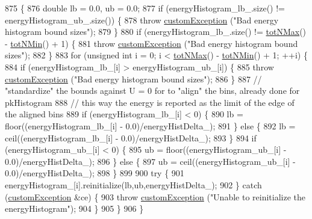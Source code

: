 \begin{DoxyCode}
875                                              \{
876     \textcolor{keywordtype}{double} lb = 0.0, ub = 0.0;
877     \textcolor{keywordflow}{if} (energyHistogram\_lb\_.size() != energyHistogram\_ub\_.size()) \{
878         \textcolor{keywordflow}{throw} \hyperlink{classcustom_exception}{customException} (\textcolor{stringliteral}{"Bad energy histogram bound sizes"});
879     \}
880     \textcolor{keywordflow}{if} (energyHistogram\_lb\_.size() != \hyperlink{classsim_system_aee2c65ecb43a35c0c4d070cdb45f7dc0}{totNMax}() - \hyperlink{classsim_system_af10842e0eaa638373b8717c87b47e6bc}{totNMin}() + 1) \{
881         \textcolor{keywordflow}{throw} \hyperlink{classcustom_exception}{customException} (\textcolor{stringliteral}{"Bad energy histogram bound sizes"});
882     \}
883     \textcolor{keywordflow}{for} (\textcolor{keywordtype}{unsigned} \textcolor{keywordtype}{int} i = 0; i < \hyperlink{classsim_system_aee2c65ecb43a35c0c4d070cdb45f7dc0}{totNMax}() - \hyperlink{classsim_system_af10842e0eaa638373b8717c87b47e6bc}{totNMin}() + 1; ++i) \{
884         \textcolor{keywordflow}{if} (energyHistogram\_lb\_[i] > energyHistogram\_ub\_[i]) \{
885             \textcolor{keywordflow}{throw} \hyperlink{classcustom_exception}{customException} (\textcolor{stringliteral}{"Bad energy histogram bound sizes"});
886         \}
887         \textcolor{comment}{// "standardize" the bounds against U = 0 for to "align" the bins, already done for pkHistogram}
888         \textcolor{comment}{// this way the energy is reported as the limit of the edge of the aligned bins}
889         \textcolor{keywordflow}{if} (energyHistogram\_lb\_[i] < 0) \{
890             lb = floor((energyHistogram\_lb\_[i] - 0.0)/energyHistDelta\_);
891         \} \textcolor{keywordflow}{else} \{
892             lb = ceil((energyHistogram\_lb\_[i] - 0.0)/energyHistDelta\_);
893         \}
894         \textcolor{keywordflow}{if} (energyHistogram\_ub\_[i] < 0) \{
895             ub = floor((energyHistogram\_ub\_[i] - 0.0)/energyHistDelta\_);
896         \} \textcolor{keywordflow}{else} \{
897             ub = ceil((energyHistogram\_ub\_[i] - 0.0)/energyHistDelta\_);
898         \}
899 
900         \textcolor{keywordflow}{try} \{
901             energyHistogram\_[i].reinitialize(lb,ub,energyHistDelta\_);
902         \} \textcolor{keywordflow}{catch} (\hyperlink{classcustom_exception}{customException} &ce) \{
903             \textcolor{keywordflow}{throw} \hyperlink{classcustom_exception}{customException} (\textcolor{stringliteral}{"Unable to reinitialize the energyHistogram"});
904         \}
905     \}
906 \}
\end{DoxyCode}
